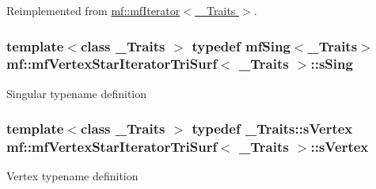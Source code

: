 Reimplemented from \hyperlink{classmf_1_1mfIterator_aca31e4d7e7eca4e3b100530d8725064b}{mf::mfIterator$<$ \_\-Traits $>$}.

\hypertarget{classmf_1_1mfVertexStarIteratorTriSurf_a5fdb4a2a1f36e5069e68a1b0c6afdbd1}{
\subsubsection[{sSing}]{\setlength{\rightskip}{0pt plus 5cm}template$<$class \_\-Traits $>$ typedef {\bf mfSing}$<$\_\-Traits$>$ {\bf mf::mfVertexStarIteratorTriSurf}$<$ \_\-Traits $>$::{\bf sSing}}}
\label{classmf_1_1mfVertexStarIteratorTriSurf_a5fdb4a2a1f36e5069e68a1b0c6afdbd1}
Singular typename definition \hypertarget{classmf_1_1mfVertexStarIteratorTriSurf_a2a1e281d8c7858e2e31d79a67d3884a3}{
\subsubsection[{sVertex}]{\setlength{\rightskip}{0pt plus 5cm}template$<$class \_\-Traits $>$ typedef \_\-Traits::sVertex {\bf mf::mfVertexStarIteratorTriSurf}$<$ \_\-Traits $>$::{\bf sVertex}}}
\label{classmf_1_1mfVertexStarIteratorTriSurf_a2a1e281d8c7858e2e31d79a67d3884a3}
Vertex typename definition 


